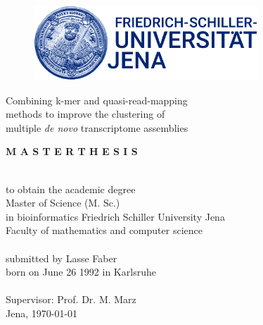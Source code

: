 \documentclass[12pt,a4paper,english]{article}
\begin{document}
	
	\pagestyle{empty}
	\begin{titlepage}
		\begin{center}
			\begin{figure}[H]
				\centering
				\includegraphics[width=0.75\textwidth]{images/Logo-Paket_Uni_Jena/Logo_Uni_Jena/Bild-Wort-Marke/jpg/UniJena_BildWortMarke_blue.jpg}
			\end{figure}
	
			\vspace*{2cm}
			\begin{large}
				Combining k-mer and quasi-read-mapping\\
				methods to improve the clustering of\\
				multiple \textit{de novo} transcriptome assemblies\\
			\end{large}

			\vspace{2cm}
			\begin{large}
			\textbf{M A S T E R  T H E S I S}\\
			\end{large}
			~\\
			to obtain the academic degree\\
			Master of Science (M. Sc.)\\
			in bioinformatics
			\vfill
			Friedrich Schiller University Jena\\
			Faculty of mathematics and computer science\\
			~\\
			submitted by Lasse Faber\\
			born on June 26 1992 in Karlsruhe\\
			~\\
			Supervisor: Prof. Dr. M. Marz\\
			Jena, \today
		\end{center}
	\end{titlepage}

\end{document}

